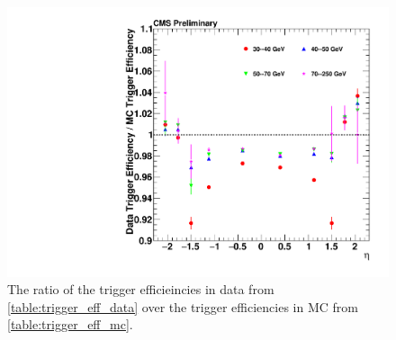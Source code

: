 \begin{figure}[!p]
    \centering
    \includegraphics[width=\textwidth]{figures/trigger_eff_ratio.pdf}
    \caption{
        The ratio of the trigger efficieincies in data from
        \cref{table:trigger_eff_data} over the trigger efficiencies in
        \MADGRAPH MC from \cref{table:trigger_eff_mc}.
    }
    \label{fig:trigger_eff_ratio}
\end{figure}
